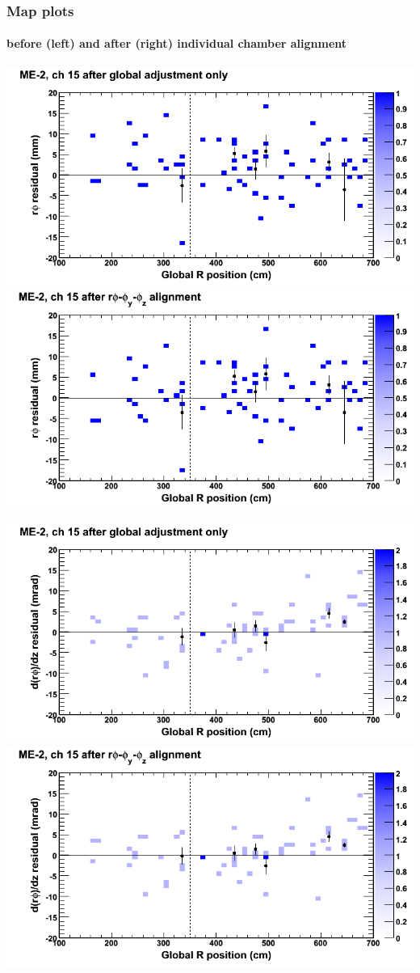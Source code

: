\documentclass[compress]{beamer}
\begin{document}
\begin{frame}
\frametitle{Map plots}
\framesubtitle{before (left) and after (right) individual chamber alignment}
\includegraphics[width=0.5\linewidth]{ringmapplots_3dof/before_CSCvsr_mem2ch15_x.png} \includegraphics[width=0.5\linewidth]{ringmapplots_3dof/after_CSCvsr_mem2ch15_x.png}

\includegraphics[width=0.5\linewidth]{ringmapplots_3dof/before_CSCvsr_mem2ch15_dxdz.png} \includegraphics[width=0.5\linewidth]{ringmapplots_3dof/after_CSCvsr_mem2ch15_dxdz.png}
\end{frame}
\end{document}
